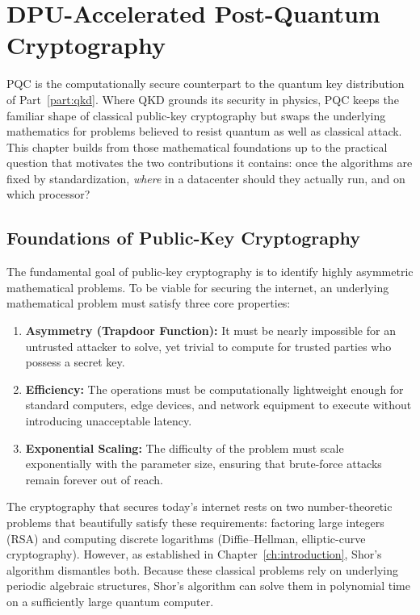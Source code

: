 \chapter{DPU-Accelerated Post-Quantum Cryptography}
\label{ch:dpu-pqc}

PQC is the computationally secure counterpart to the quantum key distribution of Part~\ref{part:qkd}. Where QKD grounds its security in physics, PQC keeps the familiar shape of classical public-key cryptography but swaps the underlying mathematics for problems believed to resist quantum as well as classical attack. This chapter builds from those mathematical foundations up to the practical question that motivates the two contributions it contains: once the algorithms are fixed by standardization, \emph{where} in a datacenter should they actually run, and on which processor?

\section{Foundations of Public-Key Cryptography}
\label{sec:pqc-foundations}

The fundamental goal of public-key cryptography is to identify highly asymmetric mathematical problems. To be viable for securing the internet, an underlying mathematical problem must satisfy three core properties:
\begin{enumerate}
    \item \textbf{Asymmetry (Trapdoor Function):} It must be nearly impossible for an untrusted attacker to solve, yet trivial to compute for trusted parties who possess a secret key.
    \item \textbf{Efficiency:} The operations must be computationally lightweight enough for standard computers, edge devices, and network equipment to execute without introducing unacceptable latency.
    \item \textbf{Exponential Scaling:} The difficulty of the problem must scale exponentially with the parameter size, ensuring that brute-force attacks remain forever out of reach.
\end{enumerate}

The cryptography that secures today's internet rests on two number-theoretic problems that beautifully satisfy these requirements: factoring large integers (RSA) and computing discrete logarithms (Diffie--Hellman, elliptic-curve cryptography). However, as established in Chapter~\ref{ch:introduction}, Shor's algorithm dismantles both. Because these classical problems rely on underlying periodic algebraic structures, Shor's algorithm can solve them in polynomial time on a sufficiently large quantum computer.

